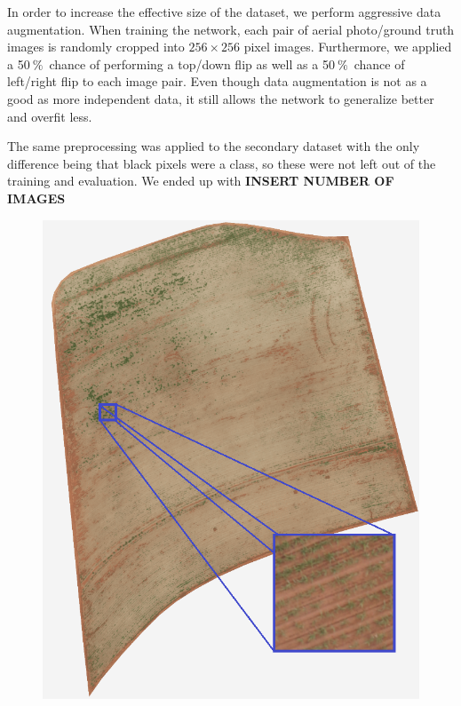 \documentclass{article}
\newcommand{\pro}{\ensuremath{\ \%}}
\begin{document}
In order to increase the effective size of the dataset, we perform aggressive data augmentation.
When training the network, each pair of aerial photo/ground truth images is randomly cropped into $ 256\times 256 $ pixel images.
Furthermore, we applied a 50\pro\ chance of performing a top/down flip as well as a 50\pro\ chance of left/right flip to each image pair.
Even though data augmentation is not as a good as more independent data, it still allows the network to generalize better and overfit less.

The same preprocessing was applied to the secondary dataset with the only difference being that black pixels were a class, so these were not left out of the training and evaluation.
We ended up with \textbf{INSERT NUMBER OF IMAGES}
\begin{figure}[!h]
	\centering
	\includegraphics[width=0.5\linewidth]{../../poster/raw-min3}
	\caption{}
	\label{fig:raw-min2}
\end{figure}
\end{document}
